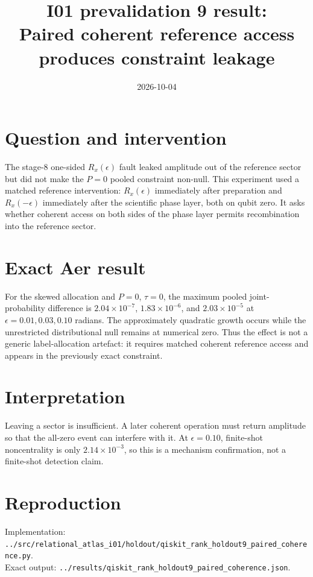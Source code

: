 \documentclass[11pt]{article}
\begin{document}
\title{I01 prevalidation 9 result:\\Paired coherent reference access produces constraint leakage}
\date{2026-10-04}
\maketitle

\section*{Question and intervention}
The stage-8 one-sided $R_x(\epsilon)$ fault leaked amplitude out of the reference
sector but did not make the $P=0$ pooled constraint non-null. This experiment used a
matched reference intervention: $R_x(\epsilon)$ immediately after preparation and
$R_x(-\epsilon)$ immediately after the scientific phase layer, both on qubit zero.
It asks whether coherent access on both sides of the phase layer permits
recombination into the reference sector.

\section*{Exact Aer result}
For the skewed allocation and $P=0$, $\tau=0$, the maximum pooled joint-probability
difference is $2.04\times10^{-7}$, $1.83\times10^{-6}$, and $2.03\times10^{-5}$ at
$\epsilon=0.01,0.03,0.10$ radians. The approximately quadratic growth occurs while
the unrestricted distributional null remains at numerical zero. Thus the effect is
not a generic label-allocation artefact: it requires matched coherent reference
access and appears in the previously exact constraint.

\section*{Interpretation}
Leaving a sector is insufficient. A later coherent operation must return amplitude
so that the all-zero event can interfere with it. At $\epsilon=0.10$, finite-shot
noncentrality is only $2.14\times10^{-3}$, so this is a mechanism confirmation, not
a finite-shot detection claim.

\section*{Reproduction}
Implementation: \texttt{../src/relational\_atlas\_i01/holdout/qiskit\_rank\_holdout9\_paired\_coherence.py}.\\
Exact output: \texttt{../results/qiskit\_rank\_holdout9\_paired\_coherence.json}.
\end{document}
